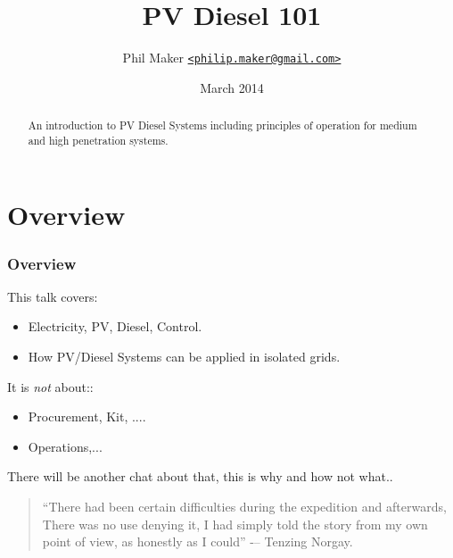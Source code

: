 \documentclass[a4paper,handout]{beamer}
\title{PV Diesel 101}
\author{Phil Maker
  \href{mailto:philip.maker@gmail.com}{\texttt{<philip.maker@gmail.com>}}
}
\institute{Powerwater Remote Operations/ACEP}
\date{March 2014}
\begin{document}
\begin{frame}
  \maketitle
  \vspace{-1.2cm}
  \begin{abstract}
    \small An introduction to PV Diesel Systems including principles
    of operation for medium and high penetration systems.
  \end{abstract}
\end{frame}

\section{Overview}
\begin{frame}\frametitle{Overview}
  This talk covers:
  \begin{itemize}
  \item Electricity, PV, Diesel, Control.
  \item How PV/Diesel Systems can be applied in isolated grids.
  \end{itemize}
  \pause
  It is \emph{not} about::

  \begin{itemize}
  \item Procurement, Kit, ....
  \item Operations,...
  \end{itemize}

  \pause
  There will be another chat about that, this is why and how not what..
  \vfill
  \begin{quote}
    ``There had been certain difficulties during
    the expedition and afterwards, There was
    no use denying it, I had simply told the
    story from my own point of view, as
    honestly as I could'' -– Tenzing Norgay.     
  \end{quote}
\end{frame}
\end{document}
